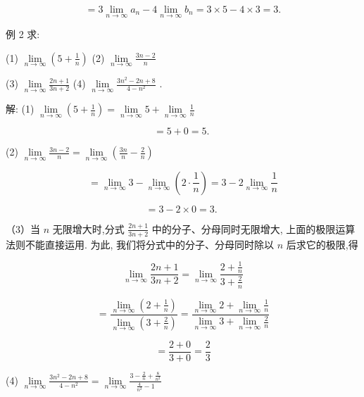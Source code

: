 \documentclass[10pt]{article}
\begin{document}
\[
= 3\mathop{\lim }\limits_{{n \rightarrow \infty }}{a}_{n} - 4\mathop{\lim }\limits_{{n \rightarrow \infty }}{b}_{n} = 3 \times 5 - 4 \times 3 = 3\text{.}
\]

例 2 求:

(1) \(\mathop{\lim }\limits_{{n \rightarrow \infty }}\left( {5 + \frac{1}{n}}\right)\) (2) \(\mathop{\lim }\limits_{{n \rightarrow \infty }}\frac{{3n} - 2}{n}\)

(3) \(\mathop{\lim }\limits_{{n \rightarrow \infty }}\frac{{2n} + 1}{{3n} + 2}\) (4) \(\mathop{\lim }\limits_{{n \rightarrow \infty }}\frac{3{n}^{2} - {2n} + 8}{4 - {n}^{2}}\) .

解: (1) \(\mathop{\lim }\limits_{{n \rightarrow \infty }}\left( {5 + \frac{1}{n}}\right) = \mathop{\lim }\limits_{{n \rightarrow \infty }}5 + \mathop{\lim }\limits_{{n \rightarrow \infty }}\frac{1}{n}\)

\[
= 5 + 0 = 5\text{. }
\]

(2) \(\mathop{\lim }\limits_{{n \rightarrow \infty }}\frac{{3n} - 2}{n} = \mathop{\lim }\limits_{{n \rightarrow \infty }}\left( {\frac{3n}{n} - \frac{2}{n}}\right)\)

\[
= \mathop{\lim }\limits_{{n \rightarrow \infty }}3 - \mathop{\lim }\limits_{{n \rightarrow \infty }}\left( {2 \cdot \frac{1}{n}}\right) = 3 - 2\mathop{\lim }\limits_{{n \rightarrow \infty }}\frac{1}{n}
\]

\[
= 3 - 2 \times 0 = 3\text{. }
\]

（3）当 \(n\) 无限增大时,分式 \(\frac{{2n} + 1}{{3n} + 2}\) 中的分子、分母同时无限增大, 上面的极限运算法则不能直接运用. 为此, 我们将分式中的分子、分母同时除以 \(n\) 后求它的极限,得

\[
\mathop{\lim }\limits_{{n \rightarrow \infty }}\frac{{2n} + 1}{{3n} + 2} = \mathop{\lim }\limits_{{n \rightarrow \infty }}\frac{2 + \frac{1}{n}}{3 + \frac{2}{n}}
\]

\[
= \frac{\mathop{\lim }\limits_{{n \rightarrow \infty }}\left( {2 + \frac{1}{n}}\right) }{\mathop{\lim }\limits_{{n \rightarrow \infty }}\left( {3 + \frac{2}{n}}\right) } = \frac{\mathop{\lim }\limits_{{n \rightarrow \infty }}2 + \mathop{\lim }\limits_{{n \rightarrow \infty }}\frac{1}{n}}{\mathop{\lim }\limits_{{n \rightarrow \infty }}3 + \mathop{\lim }\limits_{{n \rightarrow \infty }}\frac{2}{n}}
\]

\[
= \frac{2 + 0}{3 + 0} = \frac{2}{3}
\]

(4) \(\mathop{\lim }\limits_{{n \rightarrow \infty }}\frac{3{n}^{2} - {2n} + 8}{4 - {n}^{2}} = \mathop{\lim }\limits_{{n \rightarrow \infty }}\frac{3 - \frac{2}{n} + \frac{8}{{n}^{2}}}{\frac{4}{{n}^{2}} - 1}\)
\end{document}
